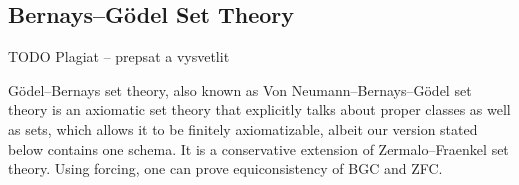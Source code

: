 \documentclass[12pt,a4paper]{article}
\begin{document}
\newpage
\subsection{Bernays–G{\"o}del Set Theory}

TODO Plagiat -- prepsat a vysvetlit


G{\"o}del–Bernays set theory, also known as Von Neumann–Bernays–G{\"o}del set theory is an axiomatic set theory that 
explicitly talks about proper classes as well as sets, which allows it to be finitely axiomatizable, albeit our version stated below contains one schema. It is a conservative extension of Zermalo–Fraenkel set theory. Using forcing, one can prove equiconsistency of BGC and ZFC.
\newline
 
\end{document}
